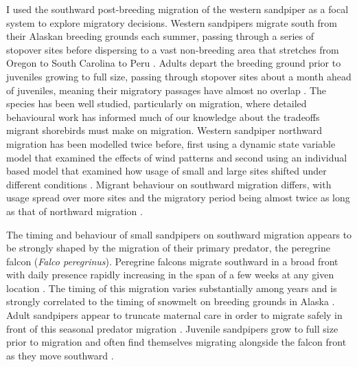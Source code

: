 
I used the southward post-breeding migration of the western sandpiper as a focal system to explore migratory decisions. Western sandpipers migrate south from their Alaskan breeding grounds each summer, passing through a series of stopover sites before dispersing to a vast non-breeding area that stretches from Oregon to South Carolina to Peru \citep{Franks2014}. Adults depart the breeding ground prior to juveniles growing to full size, passing through stopover sites about a month ahead of juveniles, meaning their migratory passages have almost no overlap \citep{Butler1987}. The species has been well studied, particularly on migration, where detailed behavioural work has informed much of our knowledge about the tradeoffs migrant shorebirds must make on migration. Western sandpiper northward migration has been modelled twice before, first using a dynamic state variable model that examined the effects of wind patterns \citep{clark_fitness_1999} and second using an individual based model that examined how usage of small and large sites shifted under different conditions \citep{Taylor2007}. Migrant behaviour on southward migration differs, with usage spread over more sites and the migratory period being almost twice as long as that of northward migration \citep{lank_effects_2003,ydenberg_interannual_2005,Hope2011,Taylor2007}. 

The timing and behaviour of small sandpipers on southward migration appears to be strongly shaped by the migration of their primary predator, the peregrine falcon (\textit{Falco peregrinus}). Peregrine falcons migrate southward in a broad front \citep[hereafter ``falcon front''; ][]{Hope2014} with daily presence rapidly increasing in the span of a few weeks at any given location \citep{lank_effects_2003}. The timing of this migration varies substantially among years and is strongly correlated to the timing of snowmelt on breeding grounds in Alaska \citep{Niehaus2006}.  Adult sandpipers appear to truncate maternal care in order to migrate safely in front of this seasonal predator migration \citep{Jamieson2014}. Juvenile sandpipers grow to full size prior to migration \citep{Stein2006b} and often find themselves migrating alongside the falcon front as they move southward \citep{Ydenberg2007b}. 

